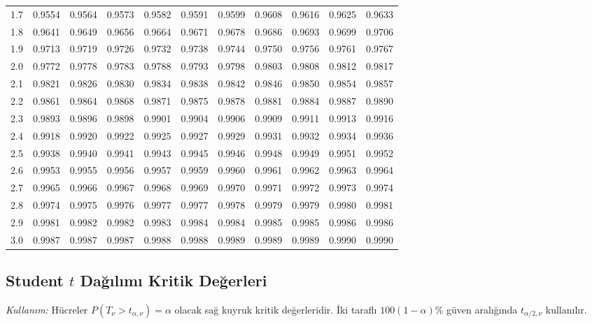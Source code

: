 \begin{center}
\begin{tabular}{c*{10}{r}}
1.7 & 0.9554 & 0.9564 & 0.9573 & 0.9582 & 0.9591 & 0.9599 & 0.9608 & 0.9616 & 0.9625 & 0.9633 \\
1.8 & 0.9641 & 0.9649 & 0.9656 & 0.9664 & 0.9671 & 0.9678 & 0.9686 & 0.9693 & 0.9699 & 0.9706 \\
1.9 & 0.9713 & 0.9719 & 0.9726 & 0.9732 & 0.9738 & 0.9744 & 0.9750 & 0.9756 & 0.9761 & 0.9767 \\
2.0 & 0.9772 & 0.9778 & 0.9783 & 0.9788 & 0.9793 & 0.9798 & 0.9803 & 0.9808 & 0.9812 & 0.9817 \\
2.1 & 0.9821 & 0.9826 & 0.9830 & 0.9834 & 0.9838 & 0.9842 & 0.9846 & 0.9850 & 0.9854 & 0.9857 \\
2.2 & 0.9861 & 0.9864 & 0.9868 & 0.9871 & 0.9875 & 0.9878 & 0.9881 & 0.9884 & 0.9887 & 0.9890 \\
2.3 & 0.9893 & 0.9896 & 0.9898 & 0.9901 & 0.9904 & 0.9906 & 0.9909 & 0.9911 & 0.9913 & 0.9916 \\
2.4 & 0.9918 & 0.9920 & 0.9922 & 0.9925 & 0.9927 & 0.9929 & 0.9931 & 0.9932 & 0.9934 & 0.9936 \\
2.5 & 0.9938 & 0.9940 & 0.9941 & 0.9943 & 0.9945 & 0.9946 & 0.9948 & 0.9949 & 0.9951 & 0.9952 \\
2.6 & 0.9953 & 0.9955 & 0.9956 & 0.9957 & 0.9959 & 0.9960 & 0.9961 & 0.9962 & 0.9963 & 0.9964 \\
2.7 & 0.9965 & 0.9966 & 0.9967 & 0.9968 & 0.9969 & 0.9970 & 0.9971 & 0.9972 & 0.9973 & 0.9974 \\
2.8 & 0.9974 & 0.9975 & 0.9976 & 0.9977 & 0.9977 & 0.9978 & 0.9979 & 0.9979 & 0.9980 & 0.9981 \\
2.9 & 0.9981 & 0.9982 & 0.9982 & 0.9983 & 0.9984 & 0.9984 & 0.9985 & 0.9985 & 0.9986 & 0.9986 \\
3.0 & 0.9987 & 0.9987 & 0.9987 & 0.9988 & 0.9988 & 0.9989 & 0.9989 & 0.9989 & 0.9990 & 0.9990 \\

\bottomrule
\end{tabular}
\end{center}


\clearpage
\subsection{Student $t$ Dağılımı Kritik Değerleri}
\textit{Kullanım:} Hücreler $P(T_\nu>t_{\alpha,\nu})=\alpha$ olacak sağ kuyruk kritik değerleridir. İki taraflı $100(1-\alpha)\%$ güven aralığında $t_{\alpha/2,\nu}$ kullanılır.

